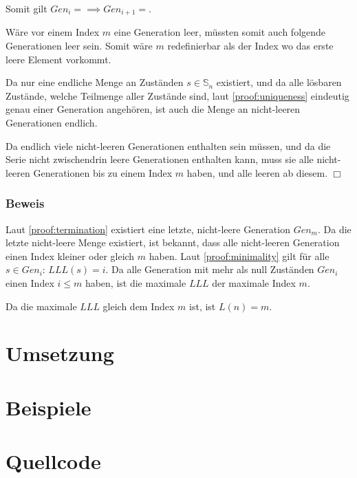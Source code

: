 \documentclass[a4paper,10pt,ngerman]{scrartcl}
\begin{document}
Somit gilt \(Gen_i = {} \implies Gen_{i+1} = {}\).

Wäre vor einem Index \(m\) eine Generation leer, müssten somit auch folgende Generationen leer sein. Somit wäre \(m\) redefinierbar als der Index wo das erste leere Element vorkommt.

Da nur eine endliche Menge an Zuständen \(s \in \mathbb{S}_n\) existiert, und da alle lösbaren Zustände, welche Teilmenge aller Zustände sind, laut \cref{proof:uniqueness} eindeutig genau einer Generation angehören, ist auch die Menge an nicht-leeren Generationen endlich.

Da endlich viele nicht-leeren Generationen enthalten sein müssen, und da die Serie nicht zwischendrin leere Generationen enthalten kann, muss sie alle nicht-leeren Generationen bis zu einem Index \(m\) haben, und alle leeren ab diesem. \(\Box\)

\subsubsection{Beweis}

Laut \cref{proof:termination} existiert eine letzte, nicht-leere Generation \(Gen_m\).
Da die letzte nicht-leere Menge existiert, ist bekannt, dass alle nicht-leeren Generation einen Index kleiner oder gleich \(m\) haben.
Laut \cref{proof:minimality} gilt für alle \(s \in Gen_i\): \(LLL(s) = i\).
Da alle Generation mit mehr als null Zuständen \(Gen_i\) einen Index \(i \leq m\) haben, ist die maximale \(LLL\) der maximale Index \(m\).

Da die maximale \(LLL\) gleich dem Index \(m\) ist, ist \(L(n) = m\).

\section{Umsetzung}

\section{Beispiele}


\section{Quellcode}

\end{document}
